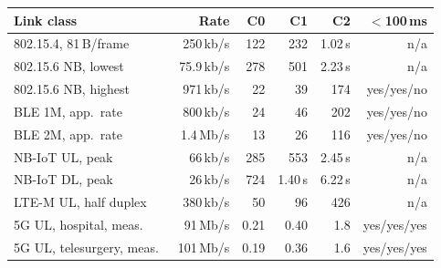 \begin{tabular}{@{}lrrrrr@{}}\toprule
Link class & Rate & C0 & C1 & C2 & $<$100\,ms \\ \midrule
802.15.4, 81\,B/frame~\cite{rfc4944} & 250\,kb/s & 122 & 232 & 1.02\,s & n/a \\
802.15.6 NB, lowest~\cite{culjak2020} & 75.9\,kb/s & 278 & 501 & 2.23\,s & n/a \\
802.15.6 NB, highest~\cite{culjak2020} & 971\,kb/s & 22 & 39 & 174 & yes/yes/no \\
BLE 1M, app.\ rate~\cite{blesig} & 800\,kb/s & 24 & 46 & 202 & yes/yes/no \\
BLE 2M, app.\ rate~\cite{blesig} & 1.4\,Mb/s & 13 & 26 & 116 & yes/yes/no \\
NB-IoT UL, peak~\cite{gsmanbiot} & 66\,kb/s & 285 & 553 & 2.45\,s & n/a \\
NB-IoT DL, peak~\cite{gsmanbiot} & 26\,kb/s & 724 & 1.40\,s & 6.22\,s & n/a \\
LTE-M UL, half duplex~\cite{gsmanbiot} & 380\,kb/s & 50 & 96 & 426 & n/a \\
5G UL, hospital, meas.~\cite{chen2024} & 91\,Mb/s & 0.21 & 0.40 & 1.8 & yes/yes/yes \\
5G UL, telesurgery, meas.~\cite{ye2026} & 101\,Mb/s & 0.19 & 0.36 & 1.6 & yes/yes/yes \\
\bottomrule\end{tabular}
